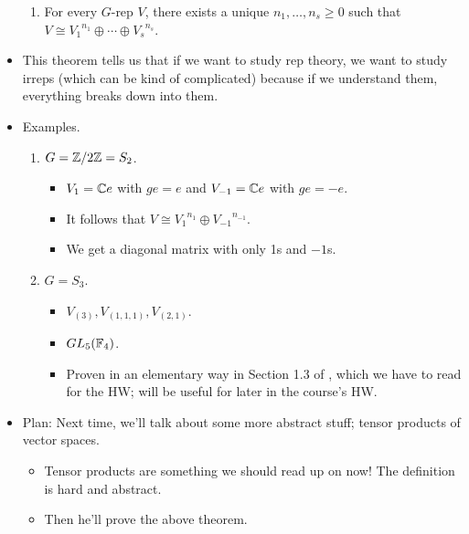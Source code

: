 \documentclass[../notes.tex]{subfiles}
\begin{document}
\begin{itemize}
\begin{enumerate}
        \item For every $G$-rep $V$, there exists a unique $n_1,\dots,n_s\geq 0$ such that $V\cong{V_1}^{n_1}\oplus\cdots\oplus{V_s}^{n_s}$.
    \end{enumerate}
    \item This theorem tells us that if we want to study rep theory, we want to study irreps (which can be kind of complicated) because if we understand them, everything breaks down into them.
    \item Examples.
    \begin{enumerate}
        \item $G=\mathbb{Z}/2\mathbb{Z}=S_2$.
        \begin{itemize}
            \item $V_1=\mathbb{C} e$ with $ge=e$ and $V_{-1}=\mathbb{C} e$ with $ge=-e$.
            \item It follows that $V\cong{V_1}^{n_1}\oplus{V_{-1}}^{n_{-1}}$.
            \item We get a diagonal matrix with only 1s and $-1$s.
        \end{itemize}
        \item $G=S_3$.
        \begin{itemize}
            \item $V_{(3)},V_{(1,1,1)},V_{(2,1)}$.
            \item $GL_5(\mathbb{F}_4)$.
            \item Proven in an elementary way in Section 1.3 of \textcite{bib:FultonHarris}, which we have to read for the HW; will be useful for later in the course's HW.
        \end{itemize}
    \end{enumerate}
    \item Plan: Next time, we'll talk about some more abstract stuff; tensor products of vector spaces.
    \begin{itemize}
        \item Tensor products are something we should read up on now! The definition is hard and abstract.
        \item Then he'll prove the above theorem.
    \end{itemize}
\end{itemize}
\end{document}
